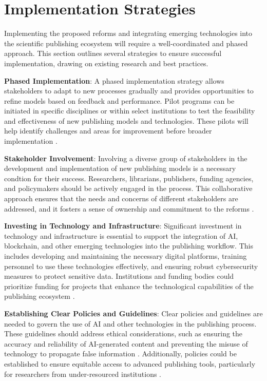 \documentclass{article}
\begin{document}
\section{Implementation Strategies}
Implementing the proposed reforms and integrating emerging technologies into the scientific publishing ecosystem will require a well-coordinated and phased approach. This section outlines several strategies to ensure successful implementation, drawing on existing research and best practices.

\textbf{Phased Implementation}: 
A phased implementation strategy allows stakeholders to adapt to new processes gradually and provides opportunities to refine models based on feedback and performance. Pilot programs can be initiated in specific disciplines or within select institutions to test the feasibility and effectiveness of new publishing models and technologies. These pilots will help identify challenges and areas for improvement before broader implementation \cite{heaven2018ai}.

\textbf{Stakeholder Involvement}: 
Involving a diverse group of stakeholders in the development and implementation of new publishing models is a necessary condtion for their success. Researchers, librarians, publishers, funding agencies, and policymakers should be actively engaged in the process. This collaborative approach ensures that the needs and concerns of different stakeholders are addressed, and it fosters a sense of ownership and commitment to the reforms \cite{schiltz2018coalition}.

\textbf{Investing in Technology and Infrastructure}: 
Significant investment in technology and infrastructure is essential to support the integration of AI, blockchain, and other emerging technologies into the publishing workflow. This includes developing and maintaining the necessary digital platforms, training personnel to use these technologies effectively, and ensuring robust cybersecurity measures to protect sensitive data. Institutions and funding bodies could prioritize funding for projects that enhance the technological capabilities of the publishing ecosystem \cite{van2017blockchain}.

\textbf{Establishing Clear Policies and Guidelines}: 
Clear policies and guidelines are needed to govern the use of AI and other technologies in the publishing process. These guidelines should address ethical considerations, such as ensuring the accuracy and reliability of AI-generated content and preventing the misuse of technology to propagate false information \cite{bender2021dangers}. Additionally, policies could be established to ensure equitable access to advanced publishing tools, particularly for researchers from under-resourced institutions \cite{leins2020gpt3}.
\end{document}
